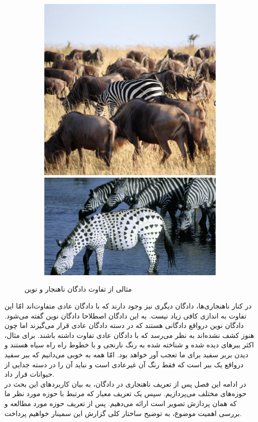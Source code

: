 \documentclass[12pt,a4paper]{report}
\theoremstyle{definition}
\theoremstyle{theorem}
\theoremstyle{definition}
\begin{document}
	\begin{figure}[hp]
		  \begin{subfigure}{\linewidth}
			  \includegraphics[width=.5\linewidth]{./images/figures/zibra-anomaly.png}\hfill
			  \includegraphics[width=.5\linewidth]{./images/figures/zibra-novel.png}
		  \end{subfigure}\par\medskip		  
		  \caption{مثالی از تفاوت دادگان ناهنجار و نوین}
		  \label{fig:novel-vs-anomaly}
	\end{figure}

در کنار ناهنجاری‌ها، دادگان دیگری نیز وجود دارند که با دادگان عادی متفاوت‌اند امّا این تفاوت به اندازی کافی زیاد نیست. به این دادگان اصطلاحا دادگان نوین گفته می‌شود. دادگان نوین درواقع دادگانی هستند که در دسته دادگان عادی قرار می‌گیرند اما چون هنوز کشف نشده‌اند به نظر می‌رسد که با دادگان عادی تفاوت داشته باشند. برای مثال، اکثر ببر‌های دیده شده و شناخته شده به رنگ نارنجی و با خطوط راه راه سیاه هستند و دیدن بربر سفید برای ما تعجب آور خواهد بود. امّا همه به خوبی می‌دانیم که ببر سفید درواقع یک ببر است که فقط رنگ آن غیرعادی است و نباید آن را در دسته جدایی از حیوانات قرار داد.\\

در ادامه این فصل پس از تعریف ناهنجاری در دادگان، به بیان کاربرد‌های این بحث در حوزه‌های مختلف می‌پردازیم. سپس یک تعریف معیار که مرتبط با حوزه مورد نظر ما که همان پردازش تصویر است ارائه می‌دهیم. پس از تعریف حوزه مورد مطالعه و بررسی اهمیت موضوع، به توضیح ساختار کلی گزارش این سمینار خواهیم پرداخت. 
		
\end{document}
